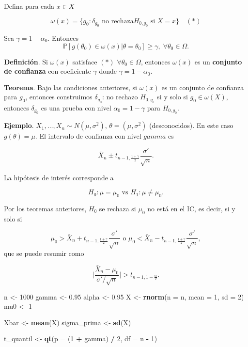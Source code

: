 \documentclass[
  12pt,
]{book}
\newenvironment{Shaded}{\begin{snugshade}}{\end{snugshade}}
\newcommand{\DataTypeTok}[1]{\textcolor[rgb]{0.13,0.29,0.53}{#1}}
\newcommand{\DecValTok}[1]{\textcolor[rgb]{0.00,0.00,0.81}{#1}}
\newcommand{\FloatTok}[1]{\textcolor[rgb]{0.00,0.00,0.81}{#1}}
\newcommand{\KeywordTok}[1]{\textcolor[rgb]{0.13,0.29,0.53}{\textbf{#1}}}
\newcommand{\NormalTok}[1]{#1}
\newcommand{\OperatorTok}[1]{\textcolor[rgb]{0.81,0.36,0.00}{\textbf{#1}}}
\newcommand{\StringTok}[1]{\textcolor[rgb]{0.31,0.60,0.02}{#1}}
\begin{document}
Defina para cada \(x\in X\)

\[\omega(x) = \{g_0: \delta_{g_0} \text{ no rechaza
}H_{0,g_0}\text{ si }X=x\} \quad (*)\]

Sea \(\gamma = 1-\alpha_0\). Entonces \[\mathbb P[g(\theta_0)\in \omega(x)|\theta
= \theta_0 ] \geq \gamma, \;\forall \theta_0 \in \Omega.\]

\textbf{Definición}. Si \(\omega(x)\) satisface \((*)\) \(\forall \theta_0 \in \Omega\),
entonces \(\omega(x)\) es un \textbf{conjunto de confianza} con coeficiente \(\gamma\)
donde \(\gamma = 1-\alpha_0\).

\textbf{Teorema}. Bajo las condiciones anteriores, si \(\omega(x)\) es un conjunto de
confianza para \(g_0\), entonces construimos \(\delta_{g_0}\): no rechazo
\(H_{0,g_0}\) si y solo si \(g_0 \in \omega(X)\), entonces \(\delta_{g_0}\) es una
prueba con nivel \(\alpha_0 = 1-\gamma\) para \(H_{0,g_0}\).

\textbf{Ejemplo}. \(X_1,\dots,X_n\sim N(\mu,\sigma^2)\), \(\theta = (\mu,\sigma^2)\)
(desconocidos). En este caso \(g(\theta) = \mu\). El intervalo de confianza con
nivel \(gamma\) es

\[\bar X_n\pm t_{n-1,\frac{1+\gamma}2}\dfrac{\sigma'}{\sqrt n}.\]

La hipótesis de interés corresponde a

\[ H_0: \mu = \mu_0 \text{ vs } H_1: \mu \ne \mu_0.\]

Por los teoremas anteriores, \(H_0\) se rechaza si \(\mu_0\) no está en el IC, es
decir, si y solo si

\[\mu_0 > \bar X_n+ t_{n-1,\frac{1+\gamma}2}\dfrac{\sigma'}{\sqrt n} \text{ o }
\mu_0 < \bar X_n- t_{n-1,\frac{1+\gamma}2}\dfrac{\sigma'}{\sqrt n},\] que se
puede resumir como

\[\bigg|\dfrac{\bar X_n-\mu_0}{\sigma'/\sqrt n}\bigg|>t_{n-1,1-\frac{\alpha}2}.\]

\begin{Shaded}
\begin{Highlighting}[]
\NormalTok{n \textless{}{-}}\StringTok{ }\DecValTok{1000}
\NormalTok{gamma \textless{}{-}}\StringTok{ }\FloatTok{0.95}
\NormalTok{alpha \textless{}{-}}\StringTok{ }\FloatTok{0.95}
\NormalTok{X \textless{}{-}}\StringTok{ }\KeywordTok{rnorm}\NormalTok{(}\DataTypeTok{n =}\NormalTok{ n, }\DataTypeTok{mean =} \DecValTok{1}\NormalTok{, }\DataTypeTok{sd =} \DecValTok{2}\NormalTok{)}
\NormalTok{mu0 \textless{}{-}}\StringTok{ }\DecValTok{1}

\NormalTok{Xbar \textless{}{-}}\StringTok{ }\KeywordTok{mean}\NormalTok{(X)}
\NormalTok{sigma\_prima \textless{}{-}}\StringTok{ }\KeywordTok{sd}\NormalTok{(X)}



\NormalTok{t\_quantil \textless{}{-}}\StringTok{ }\KeywordTok{qt}\NormalTok{(}\DataTypeTok{p =}\NormalTok{ (}\DecValTok{1} \OperatorTok{+}\StringTok{ }\NormalTok{gamma) }\OperatorTok{/}\StringTok{ }\DecValTok{2}\NormalTok{, }\DataTypeTok{df =}\NormalTok{ n }\OperatorTok{{-}}\StringTok{ }\DecValTok{1}\NormalTok{)}
\end{Highlighting}
\end{Shaded}
\end{document}
